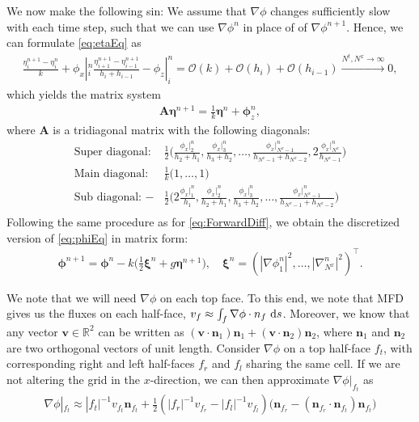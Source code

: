 \documentclass[11pt]{article}
\begin{document}
We now make the following sin: We assume that $\nabla \phi$ changes sufficiently slow with each time step, such that we can use $\nabla \phi^n$
in place of of $\nabla \phi^{n+1}$. Hence, we can formulate \eqref{eq:etaEq} as
\begin{align*}
    \frac{\eta_i^{n+1} - \eta_i^n}{k} + \phi_x|_i^{n} \frac{\eta_{i+1}^{n+1}-\eta_{i-1}^{n+1}}{h_i + h_{i-1}} - \phi_z|_i^n
                       = \mathcal{O}(k) + \mathcal{O}(h_i) + \mathcal{O}(h_{i-1}) \xrightarrow{N^t, N^x \rightarrow \infty} 0,
\end{align*}
which yields the matrix system
\begin{align}
    \label{eq:etan+1}
    \bm{A} \bm{\eta}^{n+1} = \frac{1}{k}\bm{\eta}^n + \bm{\phi}_z^n,
\end{align}
where $\bm{A}$ is a tridiagonal matrix with the following diagonals:
\begin{align*}
    \text{Super diagonal: } &\frac{1}{2} \bigg(\frac{\phi_x|_2^{n}}{h_2 + h_1}, \frac{\phi_x|_3^{n}}{h_3+h_2},
                                        \dots, \frac{\phi_x|_{N^x-1}^n}{h_{N^x-1} + h_{N^x-2}}, 2\frac{\phi_x|_{N^x}^n}{h_{N^x-1}}\bigg) \\
    \text{Main diagonal: }  &\frac{1}{k}  \Big(1, \dots, 1\Big)                                        \\
    \text{Sub diagonal: }  -&\frac{1}{2} \bigg(2\frac{\phi_x|_1^{n}}{h_1}, \frac{\phi_x|_2^{n}}{h_2+h_1}, \frac{\phi_x|_3^n}{h_3 + h_2},
                                        \dots, \frac{\phi_x|_{N^x-1}^n}{h_{N^x-1} + h_{N^x-2}}\bigg) \\
\end{align*}
Following the same procedure as for \eqref{eq:ForwardDiff}, we obtain the discretized version of \eqref{eq:phiEq} in matrix form:
\begin{align}
    \label{eq:phin+1}
    \bm{\phi}^{n+1} = \bm{\phi}^n - k\bigg(\frac{1}{2}\bm{\xi}^n + g \bm{\eta}^{n+1}\bigg), \quad \bm \xi ^{n} = \left( |\nabla \phi_1^n|^2,\ldots , |\nabla_{N^x}^n|^2 \right)^\top.
\end{align}
 

We note that we will need $\nabla \phi$ on each top face. To this end, we note that MFD gives us the fluxes on each half-face, $v_{f} \approx \int_{f} \nabla \phi \cdot n_{f} \, \operatorname{d}\! s$.
Moreover, we know that any vector $\bm{v} \in \mathbb{R}^2$ can be written as $(\bm{v}\cdot\bm{n}_1) \bm{n}_1 + (\bm{v}\cdot\bm{n}_2) \bm{n}_2$,
where $\bm{n}_1$ and $\bm{n}_2$ are two orthogonal vectors of unit length.
Consider $\nabla \phi$ on a top half-face $f_t$, with corresponding right and left half-faces $f_r$ and $f_l$ sharing the same cell.
If we are not altering the grid in the $x$-direction, we can then approximate $\nabla \phi|_{f_t}$ as
\begin{align*}
    \nabla \phi|_{f_t} \approx |f_t|^{-1} v_{f_t} \bm{n}_{f_t} + \frac{1}{2}(|f_r|^{-1}v_{f_r}-|f_l|^{-1}v_{f_l})\big(\bm{n}_{f_r} - (\bm{n}_{f_r} \cdot \bm{n}_{f_t})\bm{n}_{f_t}\big)
\end{align*}
\end{document}
